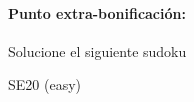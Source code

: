 \documentclass[fleqn]{article}
\begin{document}
 \paragraph*{Punto extra-bonificación:} Solucione el siguiente sudoku
 \cluefont{\Large}
 \renewcommand*{\puzzlefile}{se5.sud}
\begin{center}
\begin{minipage}{0.45\linewidth}\begin{center}
SE20 (easy) \\
\end{center}\end{minipage}
\end{center}
\end{document}
